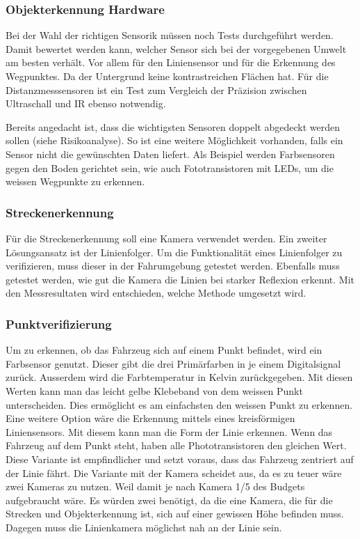 \documentclass[../main.tex]{subfiles}
\begin{document}
\subsubsection{Objekterkennung Hardware}
 Bei der Wahl der richtigen Sensorik müssen noch Tests durchgeführt werden. Damit bewertet werden kann, welcher Sensor sich bei der vorgegebenen Umwelt am besten verhält. Vor allem für den Liniensensor und für die Erkennung des Wegpunktes. Da der Untergrund keine kontrastreichen Flächen hat. Für die Distanzmesssensoren ist ein Test zum Vergleich der Präzision zwischen Ultraschall und IR ebenso notwendig.
 
 Bereits angedacht ist, dass  die wichtigsten Sensoren doppelt abgedeckt werden sollen (siehe Risikoanalyse). So ist eine weitere Möglichkeit vorhanden, falls ein Sensor nicht die gewünschten Daten liefert. Als Beispiel werden Farbsensoren gegen den Boden gerichtet sein, wie auch Fototransistoren mit LEDs, um die weissen Wegpunkte zu erkennen.

\subsubsection{Streckenerkennung}
Für die Streckenerkennung soll eine Kamera verwendet werden. Ein zweiter Lösungsansatz ist der Linienfolger. Um die Funktionalität eines Linienfolger zu verifizieren, muss dieser in der Fahrumgebung getestet werden. Ebenfalls muss getestet werden, wie gut die Kamera die Linien bei starker Reflexion erkennt. Mit den Messresultaten wird entschieden, welche Methode umgesetzt wird.


\subsubsection{Punktverifizierung}
Um zu erkennen, ob das Fahrzeug sich auf einem Punkt befindet, wird ein Farbsensor genutzt. Dieser gibt die drei Primärfarben in je einem Digitalsignal zurück. Ausserdem wird die Farbtemperatur in Kelvin zurückgegeben. Mit diesen Werten kann man das leicht gelbe Klebeband von dem weissen Punkt unterscheiden. Dies ermöglicht es am einfachsten den weissen Punkt zu erkennen. Eine weitere Option wäre die Erkennung mittels eines kreisförmigen Liniensensors. Mit diesem kann man die Form der Linie erkennen. Wenn das Fahrzeug auf dem Punkt steht, haben alle Phototransistoren den gleichen Wert. Diese Variante ist empfindlicher und setzt voraus, dass das Fahrzeug zentriert auf der Linie fährt. Die Variante mit der Kamera scheidet aus, da es zu teuer wäre zwei Kameras zu nutzen. Weil damit je nach Kamera 1/5 des Budgets aufgebraucht wäre. Es würden zwei benötigt, da die eine Kamera, die für die Strecken und Objekterkennung ist, sich auf einer gewissen Höhe befinden muss. Dagegen muss die Linienkamera möglichst nah an der Linie sein.
\end{document}
